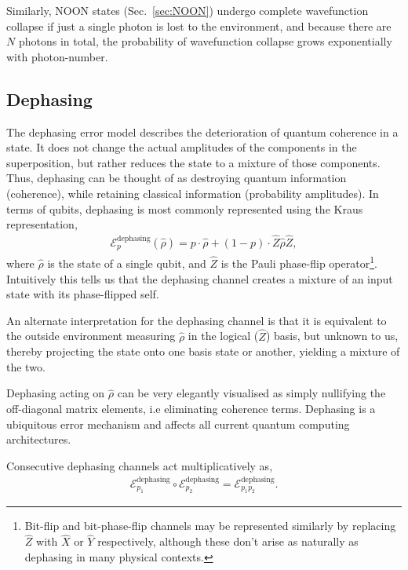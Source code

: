 \documentclass[aps, rmp, twocolumn, amsmath, amssymb, nofootinbib, superscriptaddress, longbibliography, floatfix, table-of-contents, eqsecnum]{revtex4-1}
\begin{document}
Similarly, NOON states (Sec.~\ref{sec:NOON}) undergo complete wavefunction collapse if just a single photon is lost to the environment, and because there are $N$ photons in total, the probability of wavefunction collapse grows exponentially with photon-number.

%
%

\subsection{Dephasing} \label{sec:dephasing_error} 

The dephasing error model describes the deterioration of quantum coherence in a state. It does not change the actual amplitudes of the components in the superposition, but rather reduces the state to a mixture of those components. Thus, dephasing can be thought of as destroying quantum information (coherence), while retaining classical information (probability amplitudes). In terms of qubits, dephasing is most commonly represented using the Kraus representation,
\begin{align} \label{eq:dephasing_channel}
\mathcal{E}_p^\text{dephasing}(\hat\rho) = p\cdot\hat\rho + (1-p)\cdot \hat{Z}\hat\rho\hat{Z},
\end{align}
where $\hat\rho$ is the state of a single qubit, and $\hat{Z}$ is the Pauli phase-flip operator\footnote{Bit-flip and bit-phase-flip channels may be represented similarly by replacing $\hat{Z}$ with $\hat{X}$ or $\hat{Y}$ respectively, although these don't arise as naturally as dephasing in many physical contexts.}. Intuitively this tells us that the dephasing channel creates a mixture of an input state with its phase-flipped self.

An alternate interpretation for the dephasing channel is that it is equivalent to the outside environment measuring $\hat\rho$ in the logical ($\hat{Z}$) basis, but unknown to us, thereby projecting the state onto one basis state or another, yielding a mixture of the two.

Dephasing acting on $\hat\rho$ can be very elegantly visualised as simply nullifying the off-diagonal matrix elements, i.e eliminating coherence terms. Dephasing is a ubiquitous error mechanism and affects all current quantum computing architectures.

Consecutive dephasing channels act multiplicatively as,
\begin{align} \label{eq:multi_deph}
\mathcal{E}_{p_1}^\text{dephasing} \circ \mathcal{E}_{p_2}^\text{dephasing} = \mathcal{E}_{p_1 p_2}^\text{dephasing}.
\end{align}
\end{document}
